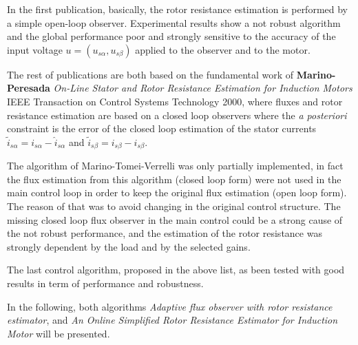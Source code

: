 \documentclass[11pt,a4paper,oneside]{book}
\numberwithin{equation}{section}
\theoremstyle{it}
\theoremstyle{definition}
\begin{document}
In the first publication, basically, the rotor resistance estimation is performed by a simple open-loop observer. Experimental results show a not robust algorithm and the global performance poor and strongly sensitive to the accuracy of the input voltage $u = \left(u_{s\alpha}, u_{s\beta}\right)$ applied to the observer and to the motor.

The rest of publications are both based on the fundamental work of \textbf{Marino-Peresada} \textit{On-Line Stator and Rotor Resistance Estimation for Induction Motors} IEEE Transaction on Control Systems Technology 2000, where fluxes and rotor resistance estimation are based on a closed loop observers where the \textit{a posteriori} constraint is the error of the closed loop estimation of the stator currents $\tilde{i}_{s\alpha} = i_{s\alpha} - \hat{i}_{s\alpha}$ and $\tilde{i}_{s\beta} = i_{s\beta} - \hat{i}_{s\beta}$.

The algorithm of Marino-Tomei-Verrelli was only partially implemented, in fact the flux estimation from this algorithm (closed loop form) were not used in the main control loop in order to keep the original flux estimation (open loop form). The reason of that was to avoid changing in the original control structure. The missing closed loop flux observer in the main control could be a strong cause of the not robust performance, and the estimation of the rotor resistance was strongly dependent by the load and by the selected gains.

The last control algorithm, proposed in the above list, as been tested with good results in term of performance and robustness. 

In the following, both algorithms \textit{Adaptive flux observer with rotor resistance estimator}, and \textit{An Online Simplified Rotor Resistance Estimator for Induction Motor} will be presented.
\end{document}
